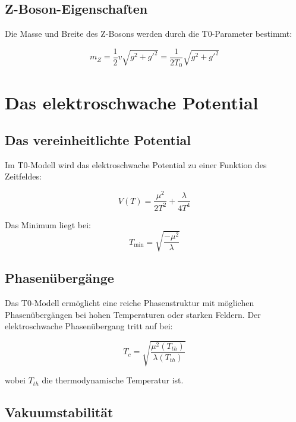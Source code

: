 \documentclass[12pt,a4paper]{report}
\begin{document}
	\subsection{Z-Boson-Eigenschaften}
	
	Die Masse und Breite des Z-Bosons werden durch die T0-Parameter bestimmt:
	
	\begin{equation}
		m_Z = \frac{1}{2}v\sqrt{g^2 + g'^2} = \frac{1}{2T_0}\sqrt{g^2 + g'^2}
	\end{equation}
	
	\section{Das elektroschwache Potential}
	
	\subsection{Das vereinheitlichte Potential}
	
	Im T0-Modell wird das elektroschwache Potential zu einer Funktion des Zeitfeldes:
	
	\begin{equation}
		V(T) = \frac{\mu^2}{2T^2} + \frac{\lambda}{4T^4}
	\end{equation}
	
	Das Minimum liegt bei:
	\begin{equation}
		T_{\min} = \sqrt{\frac{-\mu^2}{\lambda}}
	\end{equation}
	
	\subsection{Phasenübergänge}
	
	Das T0-Modell ermöglicht eine reiche Phasenstruktur mit möglichen Phasenübergängen bei hohen Temperaturen oder starken Feldern. Der elektroschwache Phasenübergang tritt auf bei:
	
	\begin{equation}
		T_c = \sqrt{\frac{\mu^2(T_{th})}{\lambda(T_{th})}}
	\end{equation}
	
	wobei $T_{th}$ die thermodynamische Temperatur ist.
	
	\subsection{Vakuumstabilität}
	
\end{document}
